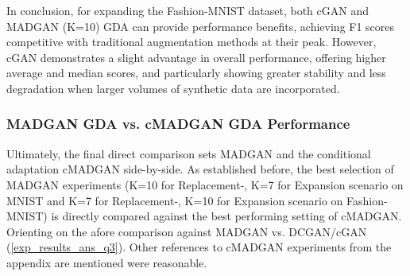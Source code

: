 In conclusion, for expanding the Fashion-MNIST dataset, both cGAN and MADGAN (K=10) GDA can provide performance benefits, achieving F1 scores competitive with traditional augmentation methods at their peak. However, cGAN demonstrates a slight advantage in overall performance, offering higher average and median scores, and particularly showing greater stability and less degradation when larger volumes of synthetic data are incorporated.

\newpage
\subsubsection[Question 4]{MADGAN GDA vs. cMADGAN GDA Performance}      \label{exp_results_ans_q4}
Ultimately, the final direct comparison sets MADGAN and the conditional adaptation cMADGAN side-by-side. As established before, the best selection of MADGAN experiments (K=10 for Replacement-, K=7 for Expansion scenario on MNIST and K=7 for Replacement-, K=10 for Expansion scenario on Fashion-MNIST) is directly compared against the best performing setting of cMADGAN. Orienting on the afore comparison against MADGAN vs. DCGAN/cGAN (\ref{exp_results_ans_q3}). Other references to cMADGAN experiments from the appendix are mentioned were reasonable. 


\newpage

